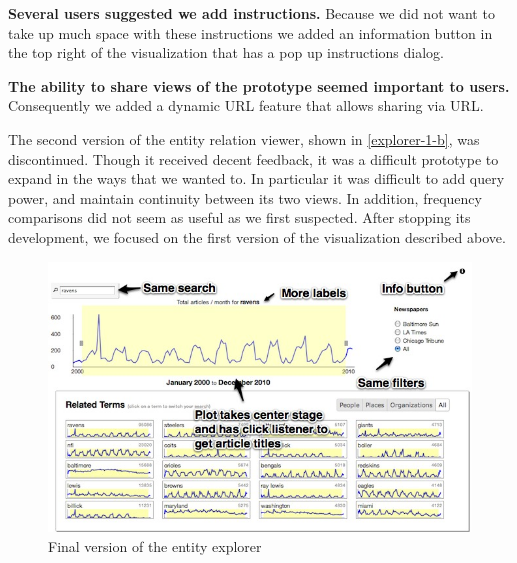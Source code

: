\textbf{Several users suggested we add instructions.} Because we did not want to take up much space with these instructions we added an information button in the top right of the visualization that has a pop up instructions dialog.

\textbf{The ability to share views of the prototype seemed important to users.} Consequently we added a dynamic URL feature that allows sharing via URL.

The second version of the entity relation viewer, shown in \ref{explorer-1-b}, was discontinued. Though it received decent feedback, it was a difficult prototype to expand in the ways that we wanted to. In particular it was difficult to add query power, and maintain continuity between its two views. In addition, frequency comparisons did not seem as useful as we first suspected. After stopping its development, we focused on the first version of the visualization described above.

\begin{figure}[htb]
  \centerline{
    \includegraphics[scale=0.37]{figures/finalTe.jpg}
  }
  \caption{Final version of the entity explorer}
  \label{fig:explorer-1}
\end{figure}
